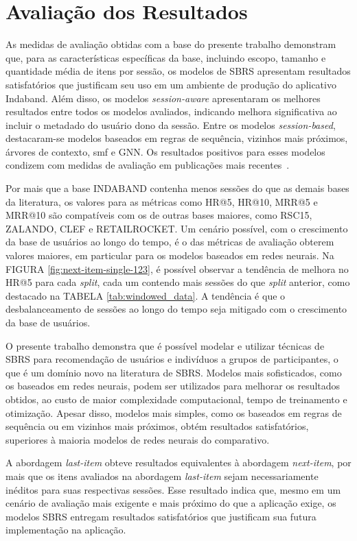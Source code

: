 \section{Avaliação dos Resultados}

As medidas de avaliação obtidas com a base do presente trabalho demonstram que,
para as características específicas da base, incluindo escopo, tamanho e
quantidade média de itens por sessão, os modelos de SBRS apresentam resultados
satisfatórios que justificam seu uso em um ambiente de produção do aplicativo
Indaband. Além disso, os modelos \textit{session-aware} apresentaram os melhores
resultados entre todos os modelos avaliados, indicando melhora significativa ao
incluir o metadado do usuário dono da sessão. Entre os modelos
\textit{session-based}, destacaram-se modelos baseados em regras de sequência,
vizinhos mais próximos, árvores de contexto, smf e GNN.  Os resultados positivos para esses modelos
condizem com medidas de avaliação em publicações mais
recentes~\cite{shehzad2024performance}.

Por mais que a base INDABAND contenha menos sessões do que as demais bases da
literatura, os valores para as métricas como HR@5, HR@10, MRR@5 e MRR@10 são
compatíveis com os de outras bases maiores, como RSC15, ZALANDO, CLEF e
RETAILROCKET. Um cenário possível, com o crescimento da base de usuários ao
longo do tempo, é o das métricas de avaliação obterem valores maiores, em
particular para os modelos baseados em redes neurais. Na FIGURA
\ref{fig:next-item-single-123}, é possível observar a tendência de melhora no
HR@5 para cada \textit{split}, cada um contendo mais sessões do que
\textit{split} anterior, como destacado na TABELA \ref{tab:windowed_data}. A
tendência é que o desbalanceamento de sessões ao longo do tempo seja mitigado
com o crescimento da base de usuários.

O presente trabalho demonstra que é possível modelar e utilizar técnicas de SBRS
para recomendação de usuários e indivíduos a grupos de participantes, o que é um
domínio novo na literatura de SBRS. Modelos mais sofisticados, como os baseados
em redes neurais, podem ser utilizados para melhorar os resultados obtidos, ao
custo de maior complexidade computacional, tempo de treinamento e otimização.
Apesar disso, modelos mais simples, como os baseados em regras de sequência ou
em vizinhos mais próximos, obtém resultados satisfatórios, superiores à maioria
modelos de redes neurais do comparativo.

A abordagem \textit{last-item} obteve resultados equivalentes à abordagem
\textit{next-item}, por mais que os itens avaliados na abordagem
\textit{last-item} sejam necessariamente inéditos para suas respectivas sessões.
Esse resultado indica que, mesmo em um cenário de avaliação mais exigente e mais
próximo do que a aplicação exige, os modelos SBRS entregam resultados
satisfatórios que justificam sua futura implementação na aplicação.
